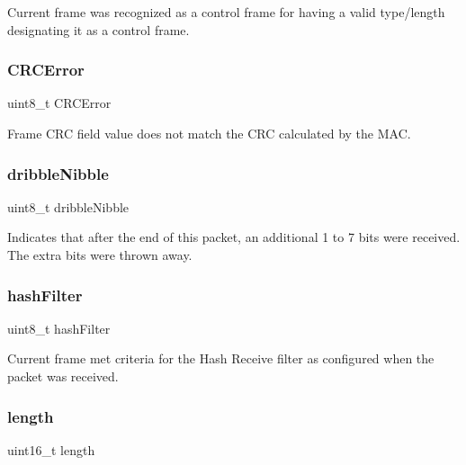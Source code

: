 Current frame was recognized as a control frame for having a valid type/length designating it as a control frame. 

\mbox{\label{struct_r_s_v__t_a331925f67a8efb3a251601448de7b1eb}} 
\subsubsection{\texorpdfstring{CRCError}{CRCError}}
{\footnotesize\ttfamily uint8\+\_\+t C\+R\+C\+Error}



Frame C\+RC field value does not match the C\+RC calculated by the M\+AC. 

\mbox{\label{struct_r_s_v__t_a907e981c9915dc72df656689b5ff1f62}} 
\subsubsection{\texorpdfstring{dribbleNibble}{dribbleNibble}}
{\footnotesize\ttfamily uint8\+\_\+t dribble\+Nibble}



Indicates that after the end of this packet, an additional 1 to 7 bits were received. The extra bits were thrown away. 

\mbox{\label{struct_r_s_v__t_a4ebbb06c87ec613dd00b55ed91c67535}} 
\subsubsection{\texorpdfstring{hashFilter}{hashFilter}}
{\footnotesize\ttfamily uint8\+\_\+t hash\+Filter}



Current frame met criteria for the Hash Receive filter as configured when the packet was received. 

\mbox{\label{struct_r_s_v__t_a1892eba2086d12ac2b09005aeb09ea3b}} 
\subsubsection{\texorpdfstring{length}{length}}
{\footnotesize\ttfamily uint16\+\_\+t length}

